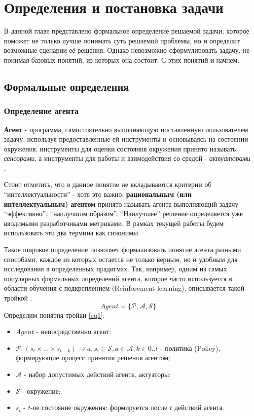 \chapter{Определения и постановка задачи} \label{ch1}

В данной главе представлено формальное определение решаемой задачи, которое поможет не 
только лучше понимать суть решаемой проблемы, но и определит возможные сценарии её решения.
Однако невозможно сформулировать задачу, не понимая базовых понятий, из которых она состоит.
С этих понятий и начнем.

\section{Формальные определения} \label{ch1:sec1}

\subsection{Определение агента} \label{ch1:sec1:subsec1}

\textbf{Агент} - программа, самостоятельно выполняющую поставленную пользователем задачу, 
используя предоставленные ей инструменты и основываясь на состоянии окружения: 
инструменты для оценки состояния окружения принято называть \textit{сенсорами}, а инструменты 
для работы и взимодействия со средой - \textit{актуаторами} \cite{AIAMA}.

Стоит отметить, что в данное понятие не вкладываются критерии об ``интеллектуальности'' - 
хотя это важно: \textbf{рациональным (или интеллектуальным) агентом} принято называть агента
выполняющий задачу ``эффективно'', ``наилучшим образом''. ``Наилучшее'' решение определяется
уже вводимыми разработчиками метриками. В рамках текущей работы будем использовать эти два
термина как синонимы.

Такое широкое определение позволяет формализовать понятие агента разными способами, 
каждое из которых остается не только верным, но и удобным для исследования в определенных
прадигмах. Так, например, одним из самых популярных формальных определений агента, 
которое часто используется в области обучения с подкреплением (Reinforcment learning),
описывается такой тройкой \cite{Sutton1998}:
\begin{equation}
    Agent = \{\mathcal{P}, \mathcal{A}, \mathcal{S}\} \label{eq1}
\end{equation}
Определим понятия тройки \ref{eq1}: 
\begin{itemize}
    \item $Agent$ - непосредственно агент;
    \item $\mathcal{P}: (s_{t} \times ... \times s_{t-k}) \rightarrow a, s_{i} \in \mathcal{S}, a \in \mathcal{A}, k \in 0..t$ - политика (Policy), формирующие процесс принятия решения агентом;
    \item $\mathcal{A}$ - набор допустимых действий агента, актуаторы;
    \item $\mathcal{S}$ - окружение; 
    \item $s_{t}$ - $t$-ое состояние окружения: формируется после $t$ действий агента.
\end{itemize}

